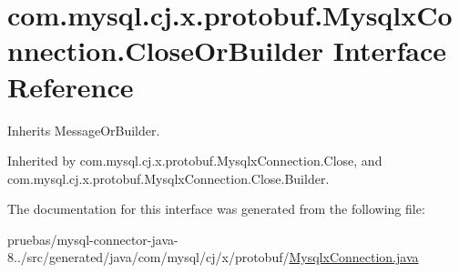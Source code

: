 \hypertarget{interfacecom_1_1mysql_1_1cj_1_1x_1_1protobuf_1_1_mysqlx_connection_1_1_close_or_builder}{}\section{com.\+mysql.\+cj.\+x.\+protobuf.\+Mysqlx\+Connection.\+Close\+Or\+Builder Interface Reference}
\label{interfacecom_1_1mysql_1_1cj_1_1x_1_1protobuf_1_1_mysqlx_connection_1_1_close_or_builder}


Inherits Message\+Or\+Builder.



Inherited by com.\+mysql.\+cj.\+x.\+protobuf.\+Mysqlx\+Connection.\+Close, and com.\+mysql.\+cj.\+x.\+protobuf.\+Mysqlx\+Connection.\+Close.\+Builder.



The documentation for this interface was generated from the following file\+:\begin{DoxyCompactItemize}
\item 
pruebas/mysql-\/connector-\/java-\/8../src/generated/java/com/mysql/cj/x/protobuf/\mbox{\hyperlink{_mysqlx_connection_8java}{Mysqlx\+Connection.\+java}}\end{DoxyCompactItemize}
